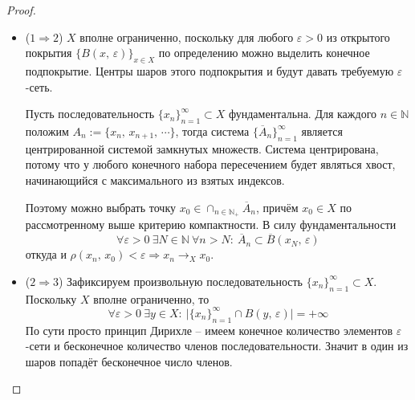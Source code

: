 \documentclass[a4paper,12pt]{article}
\theoremstyle{plain}
\theoremstyle{definition}
\theoremstyle{remark}
\begin{document}
\begin{proof}
	\begin{itemize}
		\item ($1 \Rightarrow 2$) $X$ вполне ограниченно, поскольку для любого $\varepsilon > 0$ из открытого покрытия $\{B(x,\, \varepsilon)\}_{x \in X}$ по определению можно выделить конечное подпокрытие. Центры шаров этого подпокрытия и будут давать требуемую $\varepsilon$-сеть.

		      Пусть последовательность $\{x_n\}_{n=1}^\infty \subset X$ фундаментальна. Для каждого $n \in \mathbb{N}$ положим $A_n := \{x_n,\, x_{n + 1},\, \cdots\}$, тогда система $\{\overline{A}_n\}_{n=1}^\infty$ является центрированной системой замкнутых множеств. Система центрирована, потому что у любого конечного набора пересечением будет являться хвост, начинающийся с максимального из взятых индексов.

		      Поэтому можно выбрать точку $x_0 \in \cap_{n \in \mathbb{N}_+} \overline{A}_n$, причём $x_0 \in X$ по рассмотренному выше критерию компактности. В силу фундаментальности
		      \[
			      \forall \varepsilon > 0 \: \exists N \in \mathbb{N} \: \forall n > N :\: \overline{A}_n \subset \overline{B}(x_N,\, \varepsilon)
		      \]
		      откуда и $\rho(x_n,\, x_0) < \varepsilon \Rightarrow x_n \to_X x_0$.
		\item ($2 \Rightarrow 3$) Зафиксируем произвольную последовательность $\{x_n\}_{n = 1}^\infty \subset X$. Поскольку $X$ вполне ограниченно, то
		      \[
			      \forall \varepsilon > 0 \: \exists y \in X :\: \vert\{x_n\}_{n = 1}^\infty \cap B(y,\, \varepsilon)\vert = +\infty
		      \]
		      По сути просто принцип Дирихле -- имеем конечное количество элементов $\varepsilon$-сети и бесконечное количество членов последовательности. Значит в один из шаров попадёт бесконечное число членов.


\end{itemize}
\end{proof}
\end{document}
